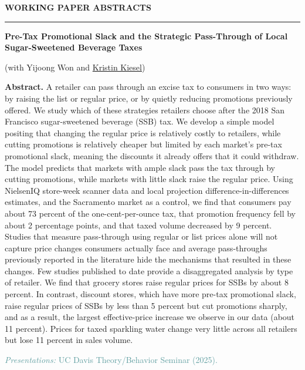 \documentclass[11pt]{article}
\newcommand{\sechead}[1]{%
  \vspace{4pt}%
  {\normalsize\bfseries\uppercase{#1}}\\[-8pt]%
  \noindent\rule{\textwidth}{0.4pt}%
  \vspace{0.5pt}%
}
\begin{document}
\sechead{Working Paper Abstracts}
\textbf{Pre-Tax Promotional Slack and the Strategic Pass-Through of Local Sugar-Sweetened Beverage Taxes}
{\small (with Yijoong Won and \href{https://kiesel.ucdavis.edu/}{Kristin Kiesel})\par}
{\small
\textbf{Abstract.} A retailer can pass through an excise tax to consumers in two ways: by raising the list or regular price, or by quietly reducing promotions previously offered. We study which of these strategies retailers choose after the 2018 San Francisco sugar-sweetened beverage (SSB) tax. We develop a simple model positing that changing the regular price is relatively costly to retailers, while cutting promotions is relatively cheaper but limited by each market’s pre-tax promotional slack, meaning the discounts it already offers that it could withdraw. The model predicts that markets with ample slack pass the tax through by cutting promotions, while markets with little slack raise the regular price. Using NielsenIQ store-week scanner data and local projection difference-in-differences estimates, and the Sacramento market as a control, we find that consumers pay about 73 percent of the one-cent-per-ounce tax, that promotion frequency fell by about 2 percentage points, and that taxed volume decreased by 9 percent. Studies that measure pass-through using regular or list prices alone will not capture price changes consumers actually face and average pass-throughs previously reported in the literature hide the mechanisms that resulted in these changes. Few studies published to date provide a disaggregated analysis by type of retailer. We find that grocery stores raise regular prices for SSBs by about 8 percent. In contrast, discount stores, which have more pre-tax promotional slack, raise regular prices of SSBs by less than 5 percent but cut promotions sharply, and as a result, the largest effective-price increase we observe in our data (about 11 percent). Prices for taxed sparkling water change very little across all retailers but lose 11 percent in sales volume.\par
}
\vspace{-0.3em}
{\footnotesize \textcolor{CadetBlue}{
\textit{Presentations:} UC Davis Theory/Behavior Seminar (2025).}\par
}

\vspace{0.5em}
\end{document}
